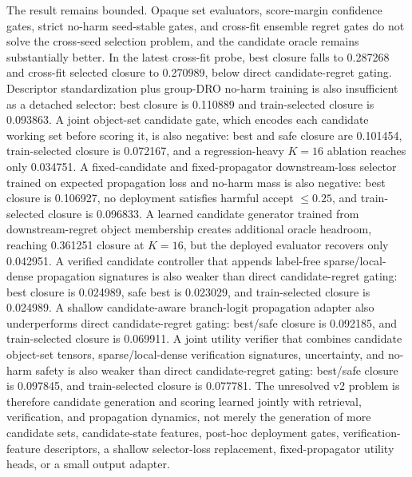 \documentclass[11pt]{article}
\begin{document}
The result remains bounded. Opaque set evaluators, score-margin confidence
gates, strict no-harm seed-stable gates, and cross-fit ensemble regret gates do
not solve the cross-seed selection problem, and the candidate oracle remains
substantially better. In the latest cross-fit probe, best closure falls to
0.287268 and cross-fit selected closure to 0.270989, below direct
candidate-regret gating. Descriptor standardization plus group-DRO no-harm
training is also insufficient as a detached selector: best closure is 0.110889
and train-selected closure is 0.093863. A joint object-set candidate gate,
which encodes each candidate working set before scoring it, is also negative:
best and safe closure are 0.101454, train-selected closure is 0.072167, and a
regression-heavy \(K=16\) ablation reaches only 0.034751. A fixed-candidate and
fixed-propagator downstream-loss selector trained on expected propagation loss
and no-harm mass is also negative: best closure is 0.106927, no deployment
satisfies harmful accept \(\leq 0.25\), and train-selected closure is 0.096833.
A learned candidate generator trained from downstream-regret object membership
creates additional oracle headroom, reaching 0.361251 closure at \(K=16\), but
the deployed evaluator recovers only 0.042951. A verified candidate controller
that appends label-free sparse/local-dense propagation signatures is also
weaker than direct candidate-regret gating: best closure is 0.024989, safe best
is 0.023029, and train-selected closure is 0.024989. A shallow candidate-aware
branch-logit propagation adapter also underperforms direct candidate-regret
gating: best/safe closure is 0.092185, and train-selected closure is 0.069911.
A joint utility verifier that combines candidate object-set tensors,
sparse/local-dense verification signatures, uncertainty, and no-harm safety is
also weaker than direct candidate-regret gating: best/safe closure is 0.097845,
and train-selected closure is 0.077781.
The unresolved v2 problem is therefore candidate generation and scoring learned
jointly with retrieval, verification, and propagation dynamics, not merely the
generation of more candidate sets, candidate-state features, post-hoc deployment
gates, verification-feature descriptors, a shallow selector-loss replacement,
fixed-propagator utility heads, or a small output adapter.
\end{document}
